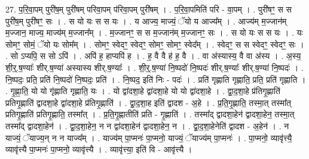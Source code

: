 \documentclass[17pt]{extarticle}
\begin{document}
27. प॒रि॒वा॒पम् पुरी॑ष॒म् पुरी॑षम् परिवा॒पम् प॑रिवा॒पम् पुरी॑षम् । . प॒रि॒वा॒पमिति॑ परि - वा॒पम् । . पुरी॑षꣳ॒॒ स स पुरी॑ष॒म् पुरी॑षꣳ॒॒ सः । . स यो यः स स यः । . य आज्य॒ माज्यं॒ ॅयो य आज्य᳚म् । . आज्य॑म् म॒ज्जान॑म् म॒ज्जान॒ माज्य॒ माज्य॑म् म॒ज्जान᳚म् । . म॒ज्जानꣳ॒॒ स स म॒ज्जान॑म् म॒ज्जानꣳ॒॒ सः । . स यो यः स स यः । . यः सोमꣳ॒॒ सोमं॒ ॅयो यः सोम᳚म् । . सोमꣳ॒॒ स्वेदꣳ॒॒ स्वेदꣳ॒॒ सोमꣳ॒॒ सोमꣳ॒॒ स्वेद᳚म् । . स्वेदꣳ॒॒ स स स्वेदꣳ॒॒ स्वेदꣳ॒॒ सः । . सो ऽप्यपि॒ स सो ऽपि॑ । . अपि॑ ह॒ हाप्यपि॑ ह । . ह॒ वै वै ह॑ ह॒ वै । . वा अ॑स्यास्य॒ वै वा अ॑स्य । . अ॒स्य॒ शी॒र्॒.ष॒ण्याः᳚ शीर्.ष॒ण्या॑ अस्यास्य शीर्.ष॒ण्याः᳚ । . शी॒र्॒.ष॒ण्या॑ नि॒ष्पदो॑ नि॒ष्पदः॑ शीर्.ष॒ण्याः᳚ शीर्.ष॒ण्या॑ नि॒ष्पदः॑ । . नि॒ष्पदः॒ प्रति॒ प्रति॑ नि॒ष्पदो॑ नि॒ष्पदः॒ प्रति॑ । . नि॒ष्पद॒ इति॑ निः - पदः॑ । . प्रति॑ गृह्णाति गृह्णाति॒ प्रति॒ प्रति॑ गृह्णाति । . गृ॒ह्णा॒ति॒ यो यो गृ॑ह्णाति गृह्णाति॒ यः । . यो द्वा॑दशा॒हे द्वा॑दशा॒हे यो यो द्वा॑दशा॒हे । . द्वा॒द॒शा॒हे प्र॑तिगृ॒ह्णाति॑ प्रतिगृ॒ह्णाति॑ द्वादशा॒हे द्वा॑दशा॒हे प्र॑तिगृ॒ह्णाति॑ । . द्वा॒द॒शा॒ह इति॑ द्वादश - अ॒हे । . प्र॒ति॒गृ॒ह्णाति॒ तस्मा॒त् तस्मा᳚त् प्रतिगृ॒ह्णाति॑ प्रतिगृ॒ह्णाति॒ तस्मा᳚त् । . प्र॒ति॒गृ॒ह्णातीति॑ प्रति - गृ॒ह्णाति॑ । . तस्मा᳚द् द्वादशा॒हेन॑ द्वादशा॒हेन॒ तस्मा॒त् तस्मा᳚द् द्वादशा॒हेन॑ । . द्वा॒द॒शा॒हेन॒ न न द्वा॑दशा॒हेन॑ द्वादशा॒हेन॒ न । . द्वा॒द॒शा॒हेनेति॑ द्वादश - अ॒हेन॑ । . न याज्यं॒ ॅयाज्य॒न् न न याज्य᳚म् । . याज्य॑म् पा॒प्मनः॑ पा॒प्मनो॒ याज्यं॒ ॅयाज्य॑म् पा॒प्मनः॑ । . पा॒प्मनो॒ व्यावृ॑त्त्यै॒ व्यावृ॑त्त्यै पा॒प्मनः॑ पा॒प्मनो॒ व्यावृ॑त्त्यै । . व्यावृ॑त्त्या॒ इति॑ वि - आवृ॑त्त्यै । \newline
\end{document}
